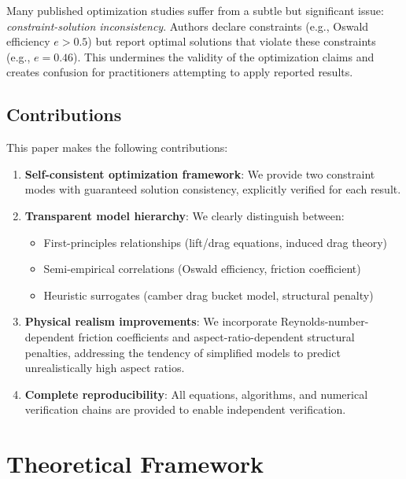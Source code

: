\documentclass[11pt,a4paper]{article}
\begin{document}
Many published optimization studies suffer from a subtle but significant issue: \textit{constraint-solution inconsistency}. Authors declare constraints (e.g., Oswald efficiency $e > 0.5$) but report optimal solutions that violate these constraints (e.g., $e = 0.46$). This undermines the validity of the optimization claims and creates confusion for practitioners attempting to apply reported results.

\subsection{Contributions}

This paper makes the following contributions:

\begin{enumerate}
    \item \textbf{Self-consistent optimization framework}: We provide two constraint modes with guaranteed solution consistency, explicitly verified for each result.
    
    \item \textbf{Transparent model hierarchy}: We clearly distinguish between:
    \begin{itemize}
        \item First-principles relationships (lift/drag equations, induced drag theory)
        \item Semi-empirical correlations (Oswald efficiency, friction coefficient)
        \item Heuristic surrogates (camber drag bucket model, structural penalty)
    \end{itemize}
    
    \item \textbf{Physical realism improvements}: We incorporate Reynolds-number-dependent friction coefficients and aspect-ratio-dependent structural penalties, addressing the tendency of simplified models to predict unrealistically high aspect ratios.
    
    \item \textbf{Complete reproducibility}: All equations, algorithms, and numerical verification chains are provided to enable independent verification.
\end{enumerate}

\section{Theoretical Framework}
\end{document}
